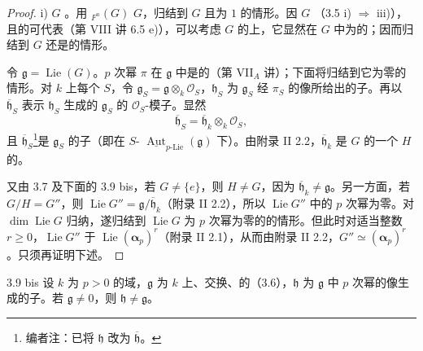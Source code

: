 \begin{proof}
i) $G$ 。用 ${}_{F^n}(G)$  $G$，归结到 $G$ 且为 $1$ 的情形。因 $G$ （3.5 i) $\Rightarrow$ iii)），且的可代表（第 VIII 讲 6.5 e)），可以考虑 $G$ 的上，它显然在 $G$ 中为的；因而归结到 $G$ 还是的情形。

令 $\mathfrak g=\operatorname{Lie}(G)$。$p$ 次幂 $\pi$ 在 $\mathfrak g$ 中是的（第 VII$_A$ 讲）；下面将归结到它为零的情形。对 $k$ 上每个 $S$，令 $\mathfrak g_S=\mathfrak g\otimes_k\mathscr O_S$，$\mathfrak h_S$ 为 $\mathfrak g_S$ 经 $\pi_S$ 的像所给出的子。再以 $\overline{\mathfrak h}_S$ 表示 $\mathfrak h_S$ 生成的 $\mathfrak g_S$ 的 $\mathscr O_S$-模子。显然
\[\overline{\mathfrak h}_S=\overline{\mathfrak h}_k\otimes_k\mathscr O_S,\]
且 $\overline{\mathfrak h}_S$\footnote{编者注：已将 $\mathfrak h$ 改为 $\overline{\mathfrak h}$。}是 $\mathfrak g_S$ 的子（即在 $S$- $\underline{\operatorname{Aut}}_{p\text{-Lie}}(\mathfrak g)$ 下）。由附录 II 2.2，$\overline{\mathfrak h}_k$ 是 $G$ 的一个 $H$ 的。

又由 3.7 及下面的 3.9 bis，若 $G\ne\{e\}$，则 $H\ne G$，因为 $\overline{\mathfrak h}_k\ne\mathfrak g$。另一方面，若 $G/H=G''$，则 $\operatorname{Lie}G''=\mathfrak g/\overline{\mathfrak h}_k$（附录 II 2.2），所以 $\operatorname{Lie}G''$ 中的 $p$ 次幂为零。对 $\dim\operatorname{Lie}G$ 归纳，遂归结到 $\operatorname{Lie}G$ 为 $p$ 次幂为零的的情形。但此时对适当整数 $r\geq0$，$\operatorname{Lie}G''$ 于 $\operatorname{Lie}(\boldsymbol\alpha_p)^r$（附录 II 2.1），从而由附录 II 2.2，$G''\simeq(\boldsymbol\alpha_p)^r$。只须再证明下述。
\end{proof}
\begin{SGAresult}{}{3.9 bis}
设 $k$ 为 $p>0$ 的域，$\mathfrak g$ 为 $k$ 上、交换、的（3.6），$\mathfrak h$ 为 $\mathfrak g$ 中 $p$ 次幂的像生成的子。若 $\mathfrak g\ne0$，则 $\mathfrak h\ne\mathfrak g$。
\end{SGAresult}

